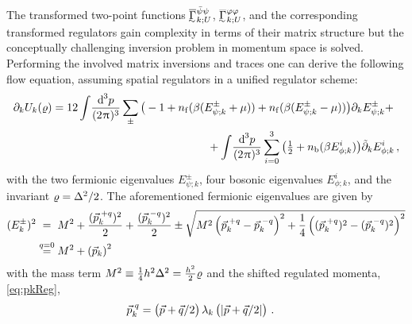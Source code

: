 The transformed two-point functions $\FSeaaEoMI_{k;U}^{\MFpsib\MFpsi}$, $\FSeaaEoMI_{k;U}^{\MFphi\MFphi}$, and the corresponding transformed regulators gain complexity in terms of their matrix structure but the conceptually challenging inversion problem in momentum space is solved. Performing the involved matrix inversions and traces one can derive the following \lpa{} flow equation, assuming spatial regulators in a unified regulator scheme:
\begin{align}
\partial_k U_k(\MFrho)&=12\int\! \frac{\dif^{\, 3}\!p}{(2\piu)^3}\sum_{\pm}\big(-1+\nf(\beta (E_{\psi;k}^\pm+\mu))+\nf(\beta (E_{\psi;k}^\pm-\mu))\big)\partial_k E_{\psi;k}^\pm+\notag\\
&\qquad\qquad\qquad\qquad\qquad\qquad\qquad +\int\! \frac{\dif^{\, 3}\!p}{(2\piu)^3}\sum_{i=0}^3\big(\tfrac{1}{2}+\nb(\beta E_{\phi;k}^i)\big)\tilde{\partial}_k E_{\phi;k}^i\,,
\label{eq:cdwFlow}
\end{align}
with the two fermionic \cdw{} eigenvalues $E_{\psi;k}^\pm$, four bosonic \cdw{} eigenvalues $E_{\phi;k}^i$, and the invariant $\varrho=\Delta^2/2$.
The aforementioned fermionic eigenvalues are given by
\begin{subequations}\label{eq:cdwEf}
\begin{align}
(E_k^\pm)^2&\stackrel{\phantom{q=0}}{=}M^2+\frac{(\vec{p}_k^{\mkern 5mu +q})^2}{2} +\frac{(\vec{p}_k^{\mkern 5mu -q})^2}{ 2}\pm\sqrt{M^2\del{\vec{p}_k^{\mkern 5mu +q}-\vec{p}_k^{\mkern 5mu -q}}^2+\frac{1}{4}\del{(\vec{p}_k^{\mkern 5mu +q})^2 -(\vec{p}_k^{\mkern 5mu -q})^2 }^2}\label{eq:cdwEfq}\\
&\stackrel{q=0}{=} M^2+\del{\vec{p}_k}^2\label{eq:cdwEf0}
\end{align}
\end{subequations}
with the mass term $M^2\equiv \frac{1}{4} h^2 \Delta^2=\frac{h^2}{2}\varrho$ and the shifted regulated momenta, \cf{} \cref{eq:pkReg},
\begin{align}
\vec{p}_k^{\mkern 5mu q}&=\del{\vec p + {\vec q/ 2}}\lambda_k\del{|\vec p + {\vec q/ 2}|}\,.
\end{align}

